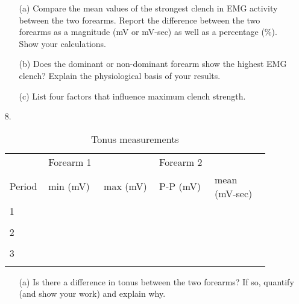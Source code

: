 \documentclass{article}
\begin{document}
\begin{itemize}
	\begin{itemize}
		\item[(a)] Compare the mean values of the strongest clench in EMG activity between the two forearms. Report the difference between the two forearms as a magnitude (mV or mV-sec) as well as a percentage (\%). Show your calculations.\vspace{6cm}
		\item[(b)] Does the dominant or non-dominant forearm show the highest EMG clench? Explain the physiological basis of your results.\vspace{5cm}
		\item[(c)] List four factors that influence maximum clench strength.\vspace{4cm}
	\end{itemize}
	
	\item[8.]
	\begin{table}[h!]
	\centering
	\caption{Tonus measurements}
	\begin{tabular}[h!]{p{0.1\linewidth}|p{0.2\linewidth}p{0.2\linewidth}|p{0.2\linewidth}p{0.2\linewidth}}
	\toprule
	& Forearm 1 & & Forearm 2 &\\
	Period & min (mV) & max (mV) & P-P (mV) & mean (mV-sec)\\
	\midrule
	1 & & & &\\& & & &\\
	
	\midrule
	2 & & & &\\& & & &\\
	\midrule
	3 & & & &\\& & & &\\
	\bottomrule
	\end{tabular}
	\end{table}
	
	\begin{itemize}
		\item[(a)] Is there a difference in tonus between the two forearms? If so, quantify (and show your work) and explain why.\vspace{6cm}
	\end{itemize}
\end{itemize}
\end{document}
